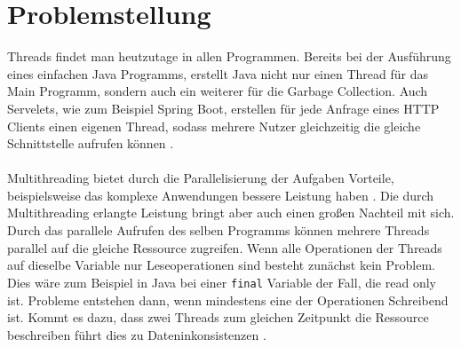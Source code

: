 \section{Problemstellung}

Threads findet man heutzutage in allen Programmen. Bereits bei der Ausführung eines einfachen Java Programms, erstellt Java nicht nur einen Thread für das Main Programm, sondern auch ein weiterer für die Garbage Collection. Auch Servelets, wie zum Beispiel Spring Boot, erstellen für jede Anfrage eines HTTP Clients einen eigenen Thread, sodass mehrere Nutzer gleichzeitig die gleiche Schnittstelle aufrufen können \cite[vgl.][8]{brian}.\\
\\
Multithreading bietet durch die Parallelisierung der Aufgaben Vorteile, beispielsweise das komplexe Anwendungen bessere Leistung haben \cite[vgl.][3]{brian}. Die durch Multithreading erlangte Leistung bringt aber auch einen großen Nachteil mit sich. Durch das parallele Aufrufen des selben Programms können mehrere Threads parallel auf die gleiche Ressource zugreifen. Wenn alle Operationen der Threads auf dieselbe Variable nur Leseoperationen sind besteht zunächst kein Problem. Dies wäre zum Beispiel in Java  bei einer \texttt{final} Variable der Fall, die read only ist. Probleme entstehen dann, wenn mindestens eine der Operationen Schreibend ist. Kommt es dazu, dass zwei Threads zum gleichen Zeitpunkt die Ressource beschreiben führt dies zu Dateninkonsistenzen \cite[vgl.][11-15]{brian}.